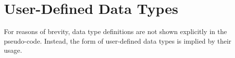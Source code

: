 \section{User-Defined Data Types}

For reasons of brevity, data type definitions are not shown explicitly in the pseudo-code. Instead, the form of user-defined data types is implied by their usage.

